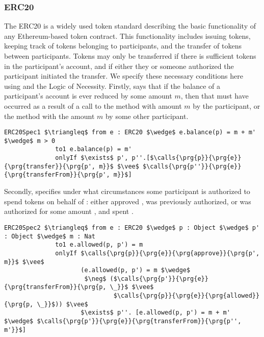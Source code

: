 \subsubsection{ERC20}
The ERC20 is a widely used token standard describing the basic functionality of any Ethereum-based token 
contract. This functionality includes issuing tokens, keeping track of tokens belonging to participants, and the 
transfer of tokens between participants. Tokens may only be transferred if there is sufficient tokens in the 
participant's account, and if either they or someone authorized the participant initiated the transfer. We 
specify these necessary conditions here using \SpecO and the Logic of Necessity. Firstly,  
says that if the balance of a participant's account is ever reduced by some amount $m$, then
that must have occurred as a result of a call to the  method with amount $m$ by the participant,
or the  method with the amount $m$ by some other participant.
\begin{lstlisting}[language = Chainmail, mathescape=true, frame=lines]
ERC20Spec1 $\triangleq$ from e : ERC20 $\wedge$ e.balance(p) = m + m' $\wedge$ m > 0
              to1 e.balance(p) = m'
              onlyIf $\exists$ p', p''.[$\calls{\prg{p}}{\prg{e}}{\prg{transfer}}{\prg{p', m}}$ $\vee$ $\calls{\prg{p''}}{\prg{e}}{\prg{transferFrom}}{\prg{p', m}}$]
\end{lstlisting}
Secondly,  specifies under what circumstances some participant  is authorized to 
spend  tokens on behalf of : either  approved ,  was previously authorized,
or  was authorized for some amount , and spent .
\begin{lstlisting}[language = Chainmail, mathescape=true, frame=lines]
ERC20Spec2 $\triangleq$ from e : ERC20 $\wedge$ p : Object $\wedge$ p' : Object $\wedge$ m : Nat
              to1 e.allowed(p, p') = m
              onlyIf $\calls{\prg{p}}{\prg{e}}{\prg{approve}}{\prg{p', m}}$ $\vee$ 
                     (e.allowed(p, p') = m $\wedge$ 
                      $\neg$ ($\calls{\prg{p'}}{\prg{e}}{\prg{transferFrom}}{\prg{p, \_}}$ $\vee$ 
                              $\calls{\prg{p}}{\prg{e}}{\prg{allowed}}{\prg{p, \_}}$)) $\vee$
                     $\exists$ p''. [e.allowed(p, p') = m + m' $\wedge$ $\calls{\prg{p'}}{\prg{e}}{\prg{transferFrom}}{\prg{p'', m'}}$]
\end{lstlisting}


